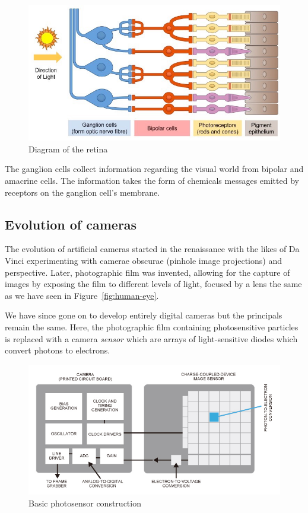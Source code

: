 \documentclass{article}
\begin{document}
\begin{figure}[ht]
  \centering
  \includegraphics[scale=0.3]{figures/retina_med.jpeg}
  \caption{\label{fig:retina} Diagram of the retina}
\end{figure}

The ganglion cells collect information regarding the visual world from bipolar and amacrine cells. The information takes the form of chemicals messages emitted by receptors on the ganglion cell's membrane.

\subsection{Evolution of cameras}

The evolution of artificial cameras started in the renaissance with the likes of Da Vinci experimenting with camerae obscurae (pinhole image projections) and perspective. Later, photographic film was invented, allowing for the capture of images by exposing the film to different levels of light, focused by a lens the same as we have seen in Figure~\ref{fig:human-eye}.

We have since gone on to develop entirely digital cameras but the principals remain the same. Here, the photographic film containing photosensitive particles is replaced with a camera \textit{sensor} which are arrays of light-sensitive diodes which convert photons to electrons.

\begin{figure}[ht]
  \centering
  \includegraphics[scale=0.3]{figures/digital-sensor.jpg}
  \caption{\label{fig:digital-sensor} Basic photosensor construction }
\end{figure}
\end{document}
